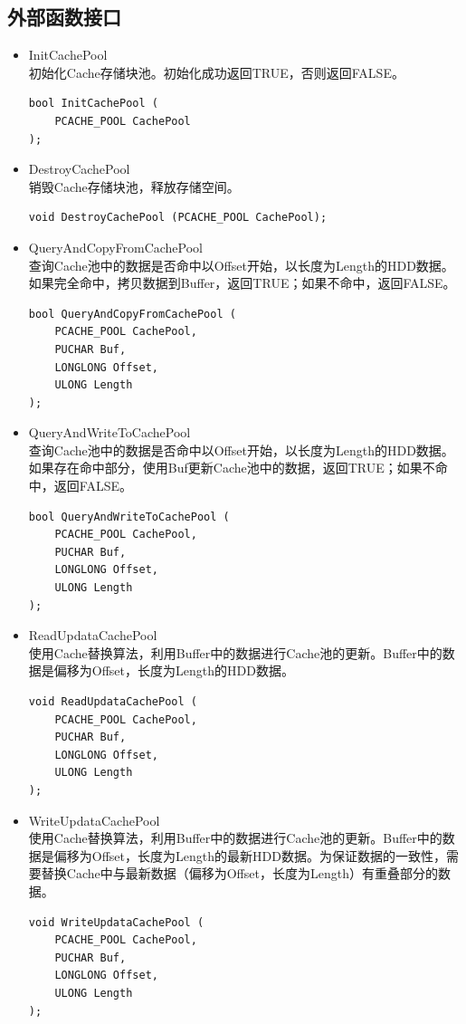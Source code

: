 \subsection{外部函数接口}
\begin{itemize}

\item InitCachePool
\\初始化Cache存储块池。初始化成功返回TRUE，否则返回FALSE。
\begin{lstlisting}
bool InitCachePool (
    PCACHE_POOL CachePool
);
\end{lstlisting}

\item DestroyCachePool
\\销毁Cache存储块池，释放存储空间。
\begin{lstlisting}
void DestroyCachePool (PCACHE_POOL CachePool);
\end{lstlisting}

\item QueryAndCopyFromCachePool
\\查询Cache池中的数据是否命中以Offset开始，以长度为Length的HDD数据。如果完全命中，拷贝数据到Buffer，返回TRUE；如果不命中，返回FALSE。
\begin{lstlisting}
bool QueryAndCopyFromCachePool (
    PCACHE_POOL CachePool,
    PUCHAR Buf,
    LONGLONG Offset,
    ULONG Length
);
\end{lstlisting}

\item QueryAndWriteToCachePool
\\查询Cache池中的数据是否命中以Offset开始，以长度为Length的HDD数据。如果存在命中部分，使用Buf更新Cache池中的数据，返回TRUE；如果不命中，返回FALSE。
\begin{lstlisting}
bool QueryAndWriteToCachePool (
    PCACHE_POOL CachePool,
    PUCHAR Buf,
    LONGLONG Offset,
    ULONG Length
);
\end{lstlisting}

\item ReadUpdataCachePool
\\使用Cache替换算法，利用Buffer中的数据进行Cache池的更新。Buffer中的数据是偏移为Offset，长度为Length的HDD数据。
\begin{lstlisting}
void ReadUpdataCachePool (
    PCACHE_POOL CachePool,
    PUCHAR Buf,
    LONGLONG Offset,
    ULONG Length
);
\end{lstlisting}

\item WriteUpdataCachePool
\\使用Cache替换算法，利用Buffer中的数据进行Cache池的更新。Buffer中的数据是偏移为Offset，长度为Length的最新HDD数据。为保证数据的一致性，需要替换Cache中与最新数据（偏移为Offset，长度为Length）有重叠部分的数据。
\begin{lstlisting}
void WriteUpdataCachePool (
    PCACHE_POOL CachePool,
    PUCHAR Buf,
    LONGLONG Offset,
    ULONG Length
);
\end{lstlisting}


\end{itemize}
